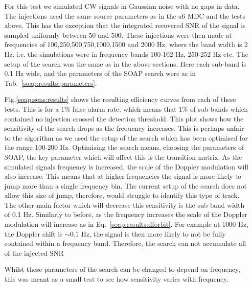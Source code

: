 For this test we simulated \gls{CW} signals in Gaussian noise with no gaps in data. 
The injections used the same source parameters as in the a6 \gls{MDC} \citep{walsh2016ComparisonMethods} and the tests above. 
This has the exception that the integrated recovered \gls{SNR} of the signal is sampled uniformly between 50 and 500. 
These injections were then made at frequencies of 100,250,500,750,1000,1500 and 2000 Hz, where the band width is 2 Hz. i.e. the simulations were in frequency bands 100-102 Hz, 250-252 Hz etc.
The setup of the search was the same as in the above sections. 
Here each sub-band is 0.1 Hz wide, and the parameters of the SOAP search were as in Tab.~\ref{soap:results:parameters}.

Fig.\ref{soap:sens:results} shows the resulting efficiency curves from each of these tests.
This is for a 1\% false alarm rate, which means that 1\% of sub-bands which contained no injection crossed the detection threshold. 
This plot shows how the sensitivity of the search drops as the frequency increases.
This is perhaps unfair to the algorithm as we used the setup of the search which has been optimised for the range 100-200 Hz.
Optimising the search means, choosing the parameters of SOAP, the key parameter which will affect this is the transition matrix. 
As the simulated signals frequency is increased, the scale of the Doppler modulation will also increase.
This means that at higher frequencies the signal is more likely to jump more than a single frequency bin. 
The current setup of the search does not allow this size of jump, therefore, would struggle to identify this type of track.
The other main factor which will decrease this sensitivity is the sub-band width of 0.1 Hz. 
Similarly to before, as the frequency increases the scale of the Doppler modulation will increase as in Eq.~\ref{soap:results:dforbit}.
For example at 1000 Hz, the Doppler shift is $\sim 0.1$ Hz, the signal is then more likely to not be fully contained within a frequency band. 
Therefore, the search can not accumulate all of the injected \gls{SNR}

Whilst these parameters of the search can be changed to depend on frequency, this was meant as a small test to see how sensitivity varies with frequency.


